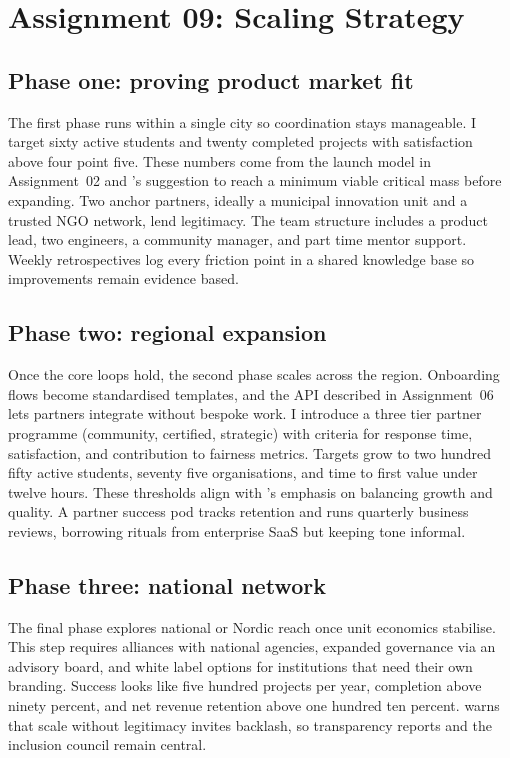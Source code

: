 \section*{Assignment 09: Scaling Strategy}

\subsection*{Phase one: proving product market fit}
The first phase runs within a single city so coordination stays manageable. I target sixty active students and twenty completed projects with satisfaction above four point five. These numbers come from the launch model in Assignment~02 and \citet{Choudary2016}'s suggestion to reach a minimum viable critical mass before expanding. Two anchor partners, ideally a municipal innovation unit and a trusted NGO network, lend legitimacy. The team structure includes a product lead, two engineers, a community manager, and part time mentor support. Weekly retrospectives log every friction point in a shared knowledge base so improvements remain evidence based.

\subsection*{Phase two: regional expansion}
Once the core loops hold, the second phase scales across the region. Onboarding flows become standardised templates, and the API described in Assignment~06 lets partners integrate without bespoke work. I introduce a three tier partner programme (community, certified, strategic) with criteria for response time, satisfaction, and contribution to fairness metrics. Targets grow to two hundred fifty active students, seventy five organisations, and time to first value under twelve hours. These thresholds align with \citet{HagiuWright2013}'s emphasis on balancing growth and quality. A partner success pod tracks retention and runs quarterly business reviews, borrowing rituals from enterprise SaaS but keeping tone informal.

\subsection*{Phase three: national network}
The final phase explores national or Nordic reach once unit economics stabilise. This step requires alliances with national agencies, expanded governance via an advisory board, and white label options for institutions that need their own branding. Success looks like five hundred projects per year, completion above ninety percent, and net revenue retention above one hundred ten percent. \citet{Srnicek2017} warns that scale without legitimacy invites backlash, so transparency reports and the inclusion council remain central.

